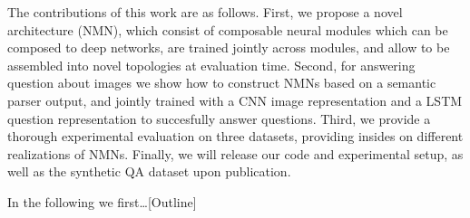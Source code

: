 
The contributions of this work are as follows. First, we propose a novel architecture \nmn (NMN), which consist of composable neural
modules which can be composed to deep networks, are trained jointly across modules, and allow to be assembled into novel topologies at evaluation time.
Second, for answering question about images we show how to construct NMNs based on a semantic parser output, and jointly trained with a CNN image representation and a LSTM question representation to succesfully answer questions. 
Third, we provide a thorough experimental evaluation on three datasets, providing insides on different realizations of NMNs.
Finally, we will release our code and experimental setup, as well as the synthetic QA dataset upon publication.

In the following we first\ldots  [Outline]